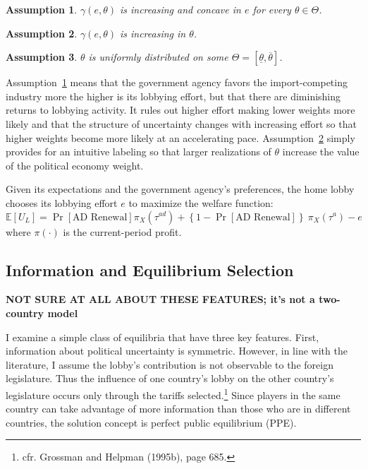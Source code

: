 \documentclass[10pt]{article}
\newtheorem{assumption}{Assumption}
\newcommand{\ta}{\theta}
\newcommand{\expect}{\mathbb{E}}
\newcommand{\ga}{\gamma}
\begin{document}
\begin{assumption}
  $\ga(e,\ta)$ is increasing and concave in $e$ for every $\ta \in \Theta$.
  \label{as:ga_c}
\end{assumption}

\begin{assumption}
  $\ga(e,\ta)$ is increasing in $\ta$.
  \label{as:ga_ta}
\end{assumption}

\begin{assumption}
  $\ta$ is uniformly distributed on some $\Theta=\left[\underline{\ta},\overline{\ta}\right]$.
  \label{as:ta}
\end{assumption}

Assumption~\ref{as:ga_c} means that the government agency favors the import-competing industry more the higher is its lobbying effort, but that there are diminishing returns to lobbying activity. It rules out higher effort making lower weights more likely and that the structure of uncertainty changes with increasing effort so that higher weights become more likely at an accelerating pace. Assumption~\ref{as:ga_ta} simply provides for an intuitive labeling so that larger realizations of $\ta$ increase the value of the political economy weight.

Given its expectations and the government agency's preferences, the home lobby chooses its lobbying effort $e$ to maximize the welfare function:
\begin{equation}
  \expect \left[U_L \right] = \Pr\left[ \text{AD Renewal} \right]  \pi_X(\tau^{\mathit{ad}}) +\left\{1-\Pr\left[ \text{AD Renewal}\right]\right\} \ \pi_X(\tau^a) - e
  \label{eq:lv}
\end{equation}
where $\pi(\cdot)$ is the current-period profit. 


\subsection{Information and Equilibrium Selection}
\label{sec:info}

\textbf{NOT SURE AT ALL ABOUT THESE FEATURES; it's not a two-country model}

I examine a simple class of equilibria that have three key features. First, information about political uncertainty is symmetric. However, in line with the literature, I assume the lobby's contribution is not observable to the foreign legislature. Thus the influence of one country's lobby on the other country's legislature occurs only through the tariffs selected.\footnote{cfr. Grossman and Helpman (1995b), page 685.} Since players in the same country can take advantage of more information than those who are in different countries, the solution concept is perfect public equilibrium (PPE).
\end{document}
